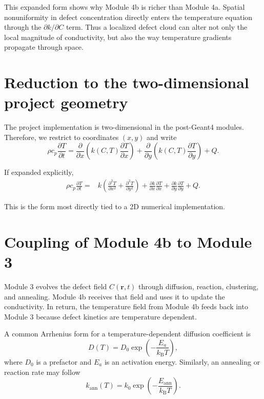 \documentclass[11pt]{article}
\newcommand{\kB}{k_{\mathrm{B}}}
\newcommand{\rvec}{\mathbf{r}}
\begin{document}
This expanded form shows why Module 4b is richer than Module 4a. Spatial nonuniformity in defect concentration directly enters the temperature equation through the $\partial k/\partial C$ term. Thus a localized defect cloud can alter not only the local magnitude of conductivity, but also the way temperature gradients propagate through space.

\section{Reduction to the two-dimensional project geometry}

The project implementation is two-dimensional in the post-Geant4 modules. Therefore, we restrict to coordinates $(x,y)$ and write
\begin{equation}
\rho c_p \frac{\partial T}{\partial t} = \frac{\partial}{\partial x}\left(k(C,T)\frac{\partial T}{\partial x}\right) + \frac{\partial}{\partial y}\left(k(C,T)\frac{\partial T}{\partial y}\right) + Q.
\end{equation}

If expanded explicitly,
\begin{align}
\rho c_p \frac{\partial T}{\partial t} = {} & k\left(\frac{\partial^2 T}{\partial x^2}+\frac{\partial^2 T}{\partial y^2}\right)
+ \frac{\partial k}{\partial x}\frac{\partial T}{\partial x}
+ \frac{\partial k}{\partial y}\frac{\partial T}{\partial y}
+ Q.
\end{align}

This is the form most directly tied to a 2D numerical implementation.

\section{Coupling of Module 4b to Module 3}

Module 3 evolves the defect field $C(\rvec,t)$ through diffusion, reaction, clustering, and annealing. Module 4b receives that field and uses it to update the conductivity. In return, the temperature field from Module 4b feeds back into Module 3 because defect kinetics are temperature dependent.

A common Arrhenius form for a temperature-dependent diffusion coefficient is
\begin{equation}
 D(T) = D_0 \exp\left(-\frac{E_a}{\kB T}\right),
\end{equation}
where $D_0$ is a prefactor and $E_a$ is an activation energy. Similarly, an annealing or reaction rate may follow
\begin{equation}
 k_{\mathrm{ann}}(T) = k_0 \exp\left(-\frac{E_{\mathrm{ann}}}{\kB T}\right).
\end{equation}
\end{document}

